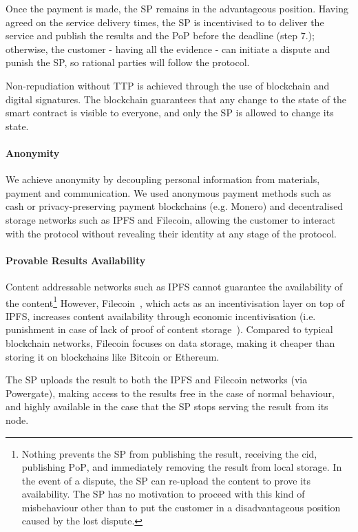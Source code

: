 \documentclass[pdftex,twocolumn,epjc3]{svjour3}
\begin{document}
{Once the payment is made, the SP remains in the advantageous position. Having agreed on the service delivery times, the SP is incentivised to to deliver the service and publish the results and the PoP before the deadline (step 7.); otherwise, the customer - having all the evidence - can initiate a dispute and punish the SP, so rational parties will follow the protocol.

Non-repudiation without TTP is achieved through the use of blockchain and digital signatures. The blockchain guarantees that any change to the state of the smart contract is visible to everyone, and only the SP is allowed to change its state. 

\paragraph{Anonymity}
We achieve anonymity by decoupling personal information from materials, payment and communication. We used anonymous payment methods such as cash or privacy-preserving payment blockchains (e.g. Monero) and decentralised storage networks such as IPFS and Filecoin, allowing the customer to interact with the protocol without revealing their identity at any stage of the protocol.

\paragraph{Provable Results Availability}\label{sec:provable-results-availability}
Content addressable networks such as IPFS cannot guarantee the availability of the content\footnote{Nothing prevents the SP from publishing the result, receiving the $\mathrm{cid}$, publishing $\mathrm{PoP}$, and immediately removing the result from local storage. In the event of a dispute, the SP can re-upload the content to prove its availability. The SP has no motivation to proceed with this kind of misbehaviour other than to put the customer in a disadvantageous position caused by the lost dispute.} However, Filecoin~\cite{protocollabsFilecoinDecentralizedStorage2017}, which acts as an incentivisation layer on top of IPFS, increases content availability through economic incentivisation (i.e. punishment in case of lack of proof of content storage~\cite{filecoinSlashing}). Compared to typical blockchain networks, Filecoin focuses on data storage, making it cheaper than storing it on blockchains like Bitcoin or Ethereum.

The SP uploads the result to both the IPFS and Filecoin networks (via Powergate), making access to the results free in the case of normal behaviour, and highly available in the case that the SP stops serving the result from its node. 

}
\end{document}

